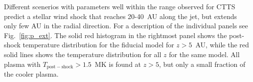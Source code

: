 \label{fig:result}
Different scenerios with parameters well within the range observed for CTTS predict a stellar wind shock that reaches 20-40~AU along the jet, but extends only few AU in the radial direction. For a description of the individual panels see Fig.~\ref{fig:p_ext}. The solid red histogram in the rightmost panel shows the post-shock temperature distribution for the fiducial model for $z>5$~AU, while the red solid lines shows the temperature distribution for all $z$ for the same model. All plasma with $T_{\mathrm{post-shock}}>1.5$~MK is found at $z>5$, but only a small fraction of the cooler plasma.
